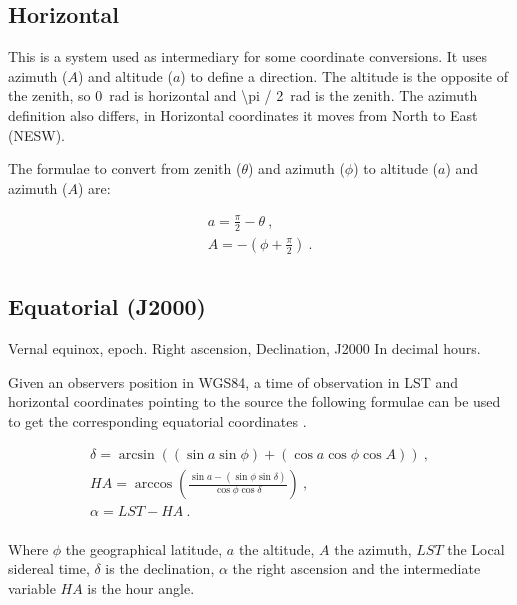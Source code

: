 \subsection{Horizontal}

This is a system used as intermediary for some coordinate conversions.
It uses azimuth ($A$) and altitude ($a$) to define a direction. The
altitude is the opposite of the zenith, so \SI{0}{\radian} is horizontal
and \SI{\pi / 2}{\radian} is the zenith. The azimuth definition also
differs, in Horizontal coordinates it moves from North to East (NESW).

The formulae to convert from zenith ($\theta$) and azimuth ($\phi$) to
altitude ($a$) and azimuth ($A$) are:

\begin{equation}
    \begin{array}{l}
        a = \frac{\pi}{2} - \theta \ , \\
        A = - (\phi + \frac{\pi}{2}) \ . \\
    \end{array}
\end{equation}


\subsection{Equatorial (J2000)}

Vernal equinox, epoch.
Right ascension, Declination, J2000
In decimal hours.

Given an observers position in WGS84, a time of observation in LST and
horizontal coordinates pointing to the source the following formulae can
be used to get the corresponding equatorial coordinates \cite[p.
37]{duffet-smith:1990aa}.

\begin{equation}
    \begin{array}{l}
        \delta = \arcsin{((\sin{a} \sin{\phi}) +
                          (\cos{a} \cos{\phi} \cos{A}))} \ , \\
        \mathit{HA} = \arccos{(\frac{\sin{a} - (\sin{\phi} \sin{\delta})}
                                    {\cos{\phi} \cos{\delta}})} \ , \\
        \alpha = \mathit{LST} - \mathit{HA} \ . \\
    \end{array}
\end{equation}

Where $\phi$ the geographical latitude, $a$ the altitude, $A$ the
azimuth, $\mathit{LST}$ the Local sidereal time, $\delta$ is the
declination, $\alpha$ the right ascension and the intermediate variable
$\mathit{HA}$ is the hour angle.


